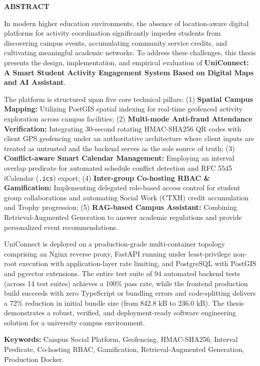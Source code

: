 \newpage
\begin{center}
    \Large{\textbf{ABSTRACT}}
\end{center}

In modern higher education environments, the absence of location-aware digital platforms for activity coordination significantly impedes students from discovering campus events, accumulating community service credits, and cultivating meaningful academic networks. To address these challenges, this thesis presents the design, implementation, and empirical evaluation of \textbf{UniConnect: A Smart Student Activity Engagement System Based on Digital Maps and AI Assistant}.

The platform is structured upon five core technical pillars: (1) \textbf{Spatial Campus Mapping:} Utilizing PostGIS spatial indexing for real-time geofenced activity exploration across campus facilities; (2) \textbf{Multi-mode Anti-fraud Attendance Verification:} Integrating 30-second rotating HMAC-SHA256 QR codes with client GPS geofencing under an authoritative architecture where client inputs are treated as untrusted and the backend serves as the sole source of truth; (3) \textbf{Conflict-aware Smart Calendar Management:} Employing an interval overlap predicate for automated schedule conflict detection and RFC 5545 iCalendar (\texttt{.ics}) export; (4) \textbf{Inter-group Co-hosting RBAC \& Gamification:} Implementing delegated role-based access control for student group collaborations and automating Social Work (CTXH) credit accumulation and Trophy progression; (5) \textbf{RAG-based Campus Assistant:} Combining Retrieval-Augmented Generation to answer academic regulations and provide personalized event recommendations.

UniConnect is deployed on a production-grade multi-container topology comprising an Nginx reverse proxy, FastAPI running under least-privilege non-root execution with application-layer rate limiting, and PostgreSQL with PostGIS and pgvector extensions. The entire test suite of 94 automated backend tests (across 14 test suites) achieves a 100\% pass rate, while the frontend production build succeeds with zero TypeScript or bundling errors and code-splitting delivers a 72\% reduction in initial bundle size (from 842.8 kB to 236.0 kB). The thesis demonstrates a robust, verified, and deployment-ready software engineering solution for a university campus environment.

\textbf{Keywords:} Campus Social Platform, Geofencing, HMAC-SHA256, Interval Predicate, Co-hosting RBAC, Gamification, Retrieval-Augmented Generation, Production Docker.
